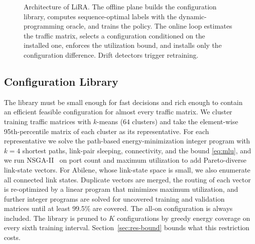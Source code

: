 \documentclass[5p,times]{elsarticle}
\begin{document}
\begin{figure}[t]
{}
\caption{Architecture of LiRA. The offline plane builds the configuration library, computes sequence-optimal labels with the dynamic-programming oracle, and trains the policy. The online loop estimates the traffic matrix, selects a configuration conditioned on the installed one, enforces the utilization bound, and installs only the configuration difference. Drift detectors trigger retraining.}
\label{fig:arch}
\end{figure}

\subsection{Configuration Library}\label{sec:library}

The library must be small enough for fast decisions and rich enough to contain an efficient feasible configuration for almost every traffic matrix. We cluster training traffic matrices with $k$-means ($64$ clusters) and take the element-wise 95th-percentile matrix of each cluster as its representative. For each representative we solve the path-based energy-minimization integer program with $k=4$ shortest paths, link-pair sleeping, connectivity, and the bound \eqref{eq:mlu}, and we run NSGA-II~\cite{deb2002nsga2} on port count and maximum utilization to add Pareto-diverse link-state vectors. For Abilene, whose link-state space is small, we also enumerate all connected link states. Duplicate vectors are merged, the routing of each vector is re-optimized by a linear program that minimizes maximum utilization, and further integer programs are solved for uncovered training and validation matrices until at least 99.5\% are covered. The all-on configuration is always included. The library is pruned to $K$ configurations by greedy energy coverage on every sixth training interval. Section~\ref{sec:res-bound} bounds what this restriction costs.
\end{document}

